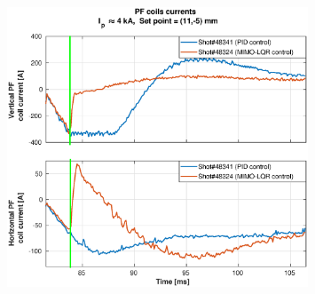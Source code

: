 \begin{figure}
	\centering
	\includegraphics[width=0.8\textwidth]{Chp5/PIDvsMIMO_341_324_curr_2.eps}
	\label{341_342_curr}
\end{figure}


